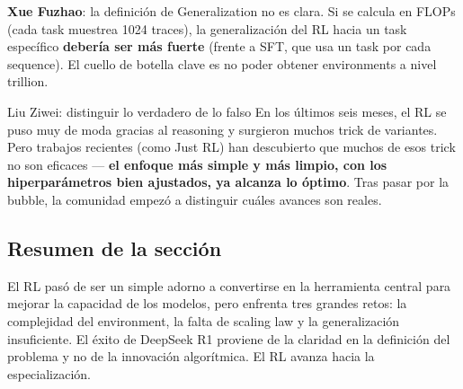 \textbf{Xue Fuzhao}: la definición de Generalization no es clara. Si se calcula en FLOPs (cada task muestrea 1024 traces), la generalización del RL hacia un task específico \textbf{debería ser más fuerte} (frente a SFT, que usa un task por cada sequence). El cuello de botella clave es no poder obtener environments a nivel trillion.

\begin{knowledgebox}{Liu Ziwei: distinguir lo verdadero de lo falso}
En los últimos seis meses, el RL se puso muy de moda gracias al reasoning y surgieron muchos trick de variantes. Pero trabajos recientes (como Just RL) han descubierto que muchos de esos trick no son eficaces — \textbf{el enfoque más simple y más limpio, con los hiperparámetros bien ajustados, ya alcanza lo óptimo}. Tras pasar por la bubble, la comunidad empezó a distinguir cuáles avances son reales.
\end{knowledgebox}

\subsection{Resumen de la sección}
El RL pasó de ser un simple adorno a convertirse en la herramienta central para mejorar la capacidad de los modelos, pero enfrenta tres grandes retos: la complejidad del environment, la falta de scaling law y la generalización insuficiente. El éxito de DeepSeek R1 proviene de la claridad en la definición del problema y no de la innovación algorítmica. El RL avanza hacia la especialización.

